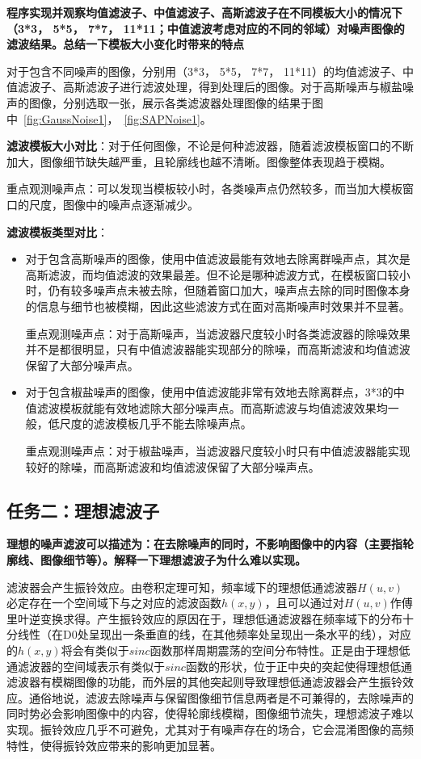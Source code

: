 \documentclass[10pt,twocolumn,letterpaper]{article}
\begin{document}
\textbf{程序实现并观察均值滤波子、中值滤波子、高斯滤波子在不同模板大小的情况下（3*3， 5*5， 7*7， 11*11；中值滤波考虑对应的不同的邻域）对噪声图像的滤波结果。总结一下模板大小变化时带来的特点}

对于包含不同噪声的图像，分别用（3*3， 5*5， 7*7， 11*11）的均值滤波子、中值滤波子、高斯滤波子进行滤波处理，得到处理后的图像。对于高斯噪声与椒盐噪声的图像，分别选取一张，展示各类滤波器处理图像的结果于图中~\ref{fig:GaussNoise1}，~\ref{fig:SAPNoise1}。

\textbf{滤波模板大小对比}：对于任何图像，不论是何种滤波器，随着滤波模板窗口的不断加大，图像细节缺失越严重，且轮廓线也越不清晰。图像整体表现趋于模糊。

重点观测噪声点：可以发现当模板较小时，各类噪声点仍然较多，而当加大模板窗口的尺度，图像中的噪声点逐渐减少。

\textbf{滤波模板类型对比}：
\begin{itemize}
   \item 对于包含高斯噪声的图像，使用中值滤波最能有效地去除离群噪声点，其次是高斯滤波，而均值滤波的效果最差。但不论是哪种滤波方式，在模板窗口较小时，仍有较多噪声点未被去除，但随着窗口加大，噪声点去除的同时图像本身的信息与细节也被模糊，因此这些滤波方式在面对高斯噪声时效果并不显著。
   
   重点观测噪声点：对于高斯噪声，当滤波器尺度较小时各类滤波器的除噪效果并不是都很明显，只有中值滤波器能实现部分的除噪，而高斯滤波和均值滤波保留了大部分噪声点。

   \item 对于包含椒盐噪声的图像，使用中值滤波能非常有效地去除离群点，3*3的中值滤波模板就能有效地滤除大部分噪声点。而高斯滤波与均值滤波效果均一般，低尺度的滤波模板几乎不能去除噪声点。
   
   重点观测噪声点：对于椒盐噪声，当滤波器尺度较小时只有中值滤波器能实现较好的除噪，而高斯滤波和均值滤波保留了大部分噪声点。
\end{itemize}

\subsection{任务二：理想滤波子}
\textbf{理想的噪声滤波可以描述为：在去除噪声的同时，不影响图像中的内容（主要指轮廓线、图像细节等）。解释一下理想滤波子为什么难以实现。}

滤波器会产生振铃效应。由卷积定理可知，频率域下的理想低通滤波器$H(u, v)$必定存在一个空间域下与之对应的滤波函数$h(x, y)$，且可以通过对$H(u,v)$作傅里叶逆变换求得。产生振铃效应的原因在于，理想低通滤波器在频率域下的分布十分线性（在D0处呈现出一条垂直的线，在其他频率处呈现出一条水平的线），对应的$h(x,y)$将会有类似于$sinc$函数那样周期震荡的空间分布特性。正是由于理想低通滤波器的空间域表示有类似于$sinc$函数的形状，位于正中央的突起使得理想低通滤波器有模糊图像的功能，而外层的其他突起则导致理想低通滤波器会产生振铃效应。通俗地说，滤波去除噪声与保留图像细节信息两者是不可兼得的，去除噪声的同时势必会影响图像中的内容，使得轮廓线模糊，图像细节流失，理想滤波子难以实现。振铃效应几乎不可避免，尤其对于有噪声存在的场合，它会混淆图像的高频特性，使得振铃效应带来的影响更加显著。
\end{document}
